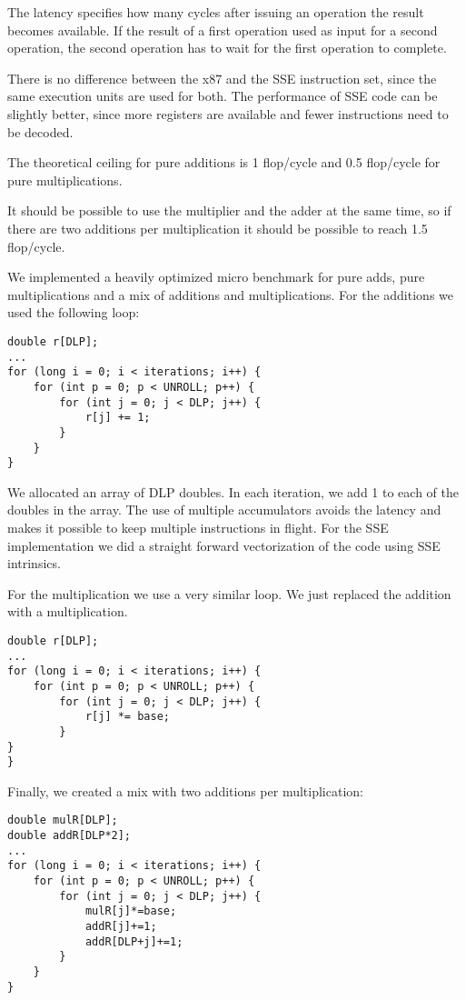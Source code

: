 \documentclass[a4paper,12pt]{report}
\begin{document}
The latency specifies how many cycles after issuing an operation the result
becomes available. If the result of a first operation used as input for a second
operation, the second operation has to wait for the first operation to complete.

There is no difference between the x87 and the SSE instruction set, since the
same execution units are used for both. The performance of SSE code can be
slightly better, since more registers are available and fewer instructions need
to be decoded.

The theoretical ceiling for pure additions is 1 flop/cycle and 0.5 flop/cycle
for pure multiplications.

It should be possible to use the multiplier and the adder at the same time, so
if there are two additions per multiplication it should be possible to reach 1.5
flop/cycle.

We implemented a heavily optimized micro benchmark for pure adds, pure
multiplications and a mix of additions and multiplications. For the additions we
used the following loop:

\begin{lstlisting}
double r[DLP];
...
for (long i = 0; i < iterations; i++) {
	for (int p = 0; p < UNROLL; p++) {
		for (int j = 0; j < DLP; j++) {
			r[j] += 1;
		}
	}
}
\end{lstlisting}

We allocated an array of DLP doubles. In each iteration, we add 1 to each of
the doubles in the array. The use of multiple accumulators avoids the latency
and makes it possible to keep multiple instructions in flight. For the SSE
implementation we did a straight forward vectorization of the code using SSE intrinsics.

For the multiplication we use a very similar loop. We just replaced the
addition with a multiplication. 

\begin{lstlisting}
double r[DLP];
...
for (long i = 0; i < iterations; i++) {
	for (int p = 0; p < UNROLL; p++) {
		for (int j = 0; j < DLP; j++) {
			r[j] *= base;
		}
}
}
\end{lstlisting}

Finally, we created a mix with two additions per multiplication:

\begin{lstlisting}
double mulR[DLP];
double addR[DLP*2];
...
for (long i = 0; i < iterations; i++) {
	for (int p = 0; p < UNROLL; p++) {
		for (int j = 0; j < DLP; j++) {
			mulR[j]*=base;
			addR[j]+=1;
			addR[DLP+j]+=1;
		}
	}
}
\end{lstlisting}
\end{document}
